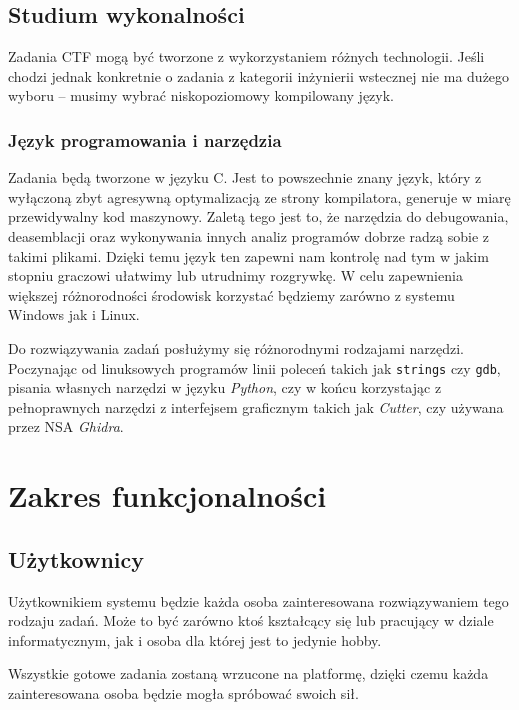 \documentclass[language=polish,type=eng]{aghmodern}
\begin{document}
\section{Studium wykonalności}

Zadania CTF mogą być tworzone z wykorzystaniem różnych technologii.
Jeśli chodzi jednak konkretnie o zadania z kategorii inżynierii wstecznej
nie ma dużego wyboru -- musimy wybrać niskopoziomowy kompilowany język.

\subsection{Język programowania i narzędzia}

Zadania będą tworzone w języku C. Jest to powszechnie znany język, który
z wyłączoną zbyt agresywną optymalizacją ze strony kompilatora, generuje
w miarę przewidywalny kod maszynowy. Zaletą tego jest to, że narzędzia
do debugowania, deasemblacji oraz wykonywania innych analiz programów
dobrze radzą sobie z takimi plikami. Dzięki temu język ten
zapewni nam kontrolę nad tym w jakim stopniu graczowi ułatwimy
lub utrudnimy rozgrywkę. W celu zapewnienia większej różnorodności
środowisk korzystać będziemy zarówno z systemu Windows jak i Linux.

Do rozwiązywania zadań posłużymy się różnorodnymi rodzajami narzędzi.
Poczynając od linuksowych programów linii poleceń takich jak \texttt{strings}
czy \texttt{gdb}, pisania własnych narzędzi w języku \emph{Python},
czy w końcu korzystając z pełnoprawnych narzędzi z interfejsem graficznym takich
jak \emph{Cutter}, czy używana przez NSA \emph{Ghidra}.

\chapter{Zakres funkcjonalności}

\section{Użytkownicy}

Użytkownikiem systemu będzie każda osoba zainteresowana rozwiązywaniem
tego rodzaju zadań. Może to być zarówno ktoś kształcący się lub pracujący
w dziale informatycznym, jak i osoba dla której jest to jedynie hobby.

Wszystkie gotowe zadania zostaną wrzucone na platformę, dzięki czemu
każda zainteresowana osoba będzie mogła spróbować swoich sił.
\end{document}
